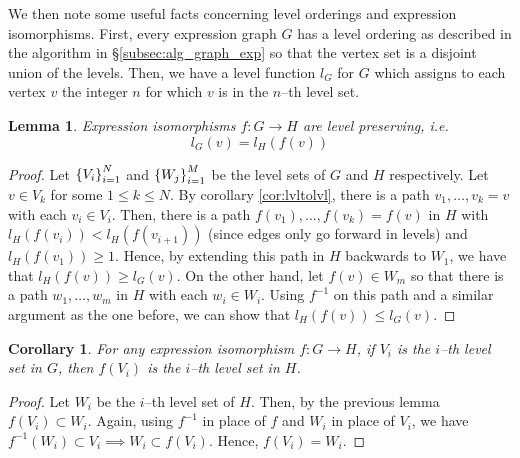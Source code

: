 \documentclass{amsart}
\renewcommand{\to}[1][]{\stackrel{#1}{\longrightarrow}}
\newcommand{\curly}[1]{\left\{ #1 \right\}}
\newcommand{\set}[2][]{\ifthenelse{\equal{#1}{}}
                                  {\curly{#2}}
                                  {\curly{#1\ \textbf{:}\ #2}}}
\numberwithin{thm}{section}
\newtheorem{lem}[thm]{Lemma}
\newtheorem{cor}[thm]{Corollary}
\theoremstyle{definition}
\begin{document}
We then note some useful facts concerning level orderings and expression
isomorphisms. First, every expression graph $G$ has a level ordering as
described in the algorithm in \S\ref{subsec:alg_graph_exp} so that the vertex
set is a disjoint union of the levels. Then, we have a level function $l_G$ for
$G$ which assigns to each vertex $v$ the integer $n$ for which $v$ is in the
$n$--th level set.

\begin{lem}\label{thm:expiso_lvlpres}
Expression isomorphisms $f : G \to H$ are level preserving, i.e.
\[
  l_G(v) = l_H(f(v))
\]
\end{lem}
\begin{proof}
Let
$\set{V_i}_{i = 1}^{N}$ and
$\set{W_j}_{i = 1}^{M}$ be the level sets of $G$ and $H$
respectively. Let $v \in V_k$ for some $1 \leq k \leq N$.
By corollary \ref{cor:lvltolvl}, there is a path $v_1, \dots, v_k = v$ with each
$v_i \in V_i$. Then, there is a path $f(v_1), \dots, f(v_k) = f(v)$ in $H$ with
$l_H(f(v_{i})) < l_H(f(v_{i + 1}))$ (since edges only go forward in levels) and
$l_H(f(v_1)) \geq 1$. Hence, by extending this path in $H$ backwards to $W_1$,
we have that $l_H(f(v)) \geq l_G(v)$.
On the other hand, let $f(v) \in W_m$ so that there is
a path $w_1, \dots, w_m$ in $H$ with each $w_i \in W_i$. Using $f^{-1}$ on this
path and a similar argument as the one before, we can show that
$l_H(f(v)) \leq l_G(v)$.
\end{proof}

\begin{cor}
For any expression isomorphism $f : G \to H$, if $V_i$ is the $i$--th level set
in $G$, then $f(V_i)$ is the $i$--th level set in $H$.
\end{cor}
\begin{proof}
Let $W_i$ be the $i$--th level set of $H$. Then, by the previous lemma
$f(V_i) \subset W_i$. Again, using $f^{-1}$ in place of $f$ and $W_i$ in place
of $V_i$, we have
$f^{-1}(W_i) \subset V_i \implies W_i \subset f(V_i)$. Hence, $f(V_i) = W_i$.
\end{proof}
\end{document}
